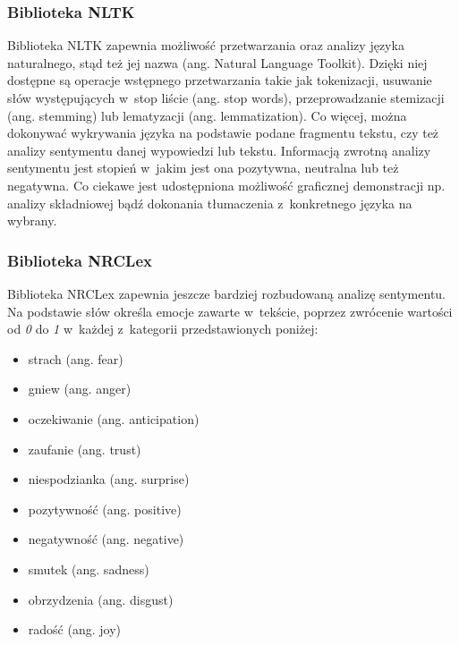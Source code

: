 \documentclass[../Kamil_Kowalewski_Main.tex]{subfiles}
\begin{document}
{{{            \subsubsection{Biblioteka NLTK}
            \label{chapter4:srodowisko_eksperymentalne:impl_programu:bib:nltk} {
                Biblioteka NLTK\cite{website:nltk} zapewnia możliwość przetwarzania
                oraz analizy języka naturalnego, stąd też jej nazwa (ang. Natural
                Language Toolkit). Dzięki niej dostępne są operacje wstępnego
                przetwarzania takie jak tokenizacji, usuwanie słów występujących w~stop
                liście (ang. stop words), przeprowadzanie stemizacji (ang. stemming) lub
                lematyzacji (ang. lemmatization). Co więcej, można dokonywać wykrywania
                języka na podstawie podane fragmentu tekstu, czy też analizy sentymentu
                danej wypowiedzi lub tekstu. Informacją zwrotną analizy sentymentu
                jest stopień w~jakim jest ona pozytywna, neutralna lub też negatywna.
                Co ciekawe jest udostępniona możliwość graficznej demonstracji np.
                analizy składniowej bądź dokonania tłumaczenia z~konkretnego języka
                na wybrany.
            }

            \subsubsection{Biblioteka NRCLex}
            \label{chapter4:srodowisko_eksperymentalne:impl_programu:bib:nrclex} {
                Biblioteka NRCLex\cite{website:nrclex} zapewnia jeszcze bardziej
                rozbudowaną analizę sentymentu. Na podstawie słów określa emocje
                zawarte w~tekście, poprzez zwrócenie wartości od \textit{0} do
                \textit{1} w~każdej z~kategorii przedstawionych poniżej:
                \begin{itemize}[noitemsep,topsep=1pt]
                    \item strach (ang. fear)
                    \item gniew (ang. anger)
                    \item oczekiwanie (ang. anticipation)
                    \item zaufanie (ang. trust)
                    \item niespodzianka (ang. surprise)
                    \item pozytywność (ang. positive)
                    \item negatywność (ang. negative)
                    \item smutek (ang. sadness)
                    \item obrzydzenia (ang. disgust)
                    \item radość (ang. joy)
                \end{itemize}

}}}}
\end{document}
